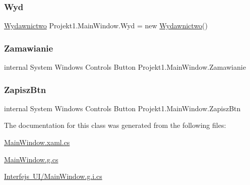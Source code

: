 \mbox{\label{class_projekt1_1_1_main_window_a3bdf5697cd74ad55fe1309996783f642}} 
\subsubsection{\texorpdfstring{Wyd}{Wyd}}
{\footnotesize\ttfamily \mbox{\hyperlink{class_projekt1_1_1_wydawnictwo}{Wydawnictwo}} Projekt1.\+Main\+Window.\+Wyd = new \mbox{\hyperlink{class_projekt1_1_1_wydawnictwo}{Wydawnictwo}}()\hspace{0.3cm}{\ttfamily [private]}}

\mbox{\label{class_projekt1_1_1_main_window_ad1ebff02a9f776ed0dc0b589e20c4f44}} 
\subsubsection{\texorpdfstring{Zamawianie}{Zamawianie}}
{\footnotesize\ttfamily internal System Windows Controls Button Projekt1.\+Main\+Window.\+Zamawianie\hspace{0.3cm}{\ttfamily [private]}}

\mbox{\label{class_projekt1_1_1_main_window_a9c1af4735589de8481ffd56c9f07f72a}} 
\subsubsection{\texorpdfstring{ZapiszBtn}{ZapiszBtn}}
{\footnotesize\ttfamily internal System Windows Controls Button Projekt1.\+Main\+Window.\+Zapisz\+Btn\hspace{0.3cm}{\ttfamily [private]}}



The documentation for this class was generated from the following files\+:\begin{DoxyCompactItemize}
\item 
\mbox{\hyperlink{_main_window_8xaml_8cs}{Main\+Window.\+xaml.\+cs}}\item 
\mbox{\hyperlink{_main_window_8g_8cs}{Main\+Window.\+g.\+cs}}\item 
\mbox{\hyperlink{_interfejs_01_u_i_2_main_window_8g_8i_8cs}{Interfejs U\+I/\+Main\+Window.\+g.\+i.\+cs}}\end{DoxyCompactItemize}
